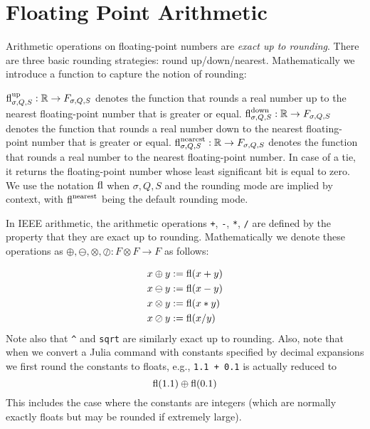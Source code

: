 
\section{Floating Point Arithmetic}
Arithmetic operations on floating-point numbers are  \emph{exact up to rounding}. There are three basic rounding strategies: round up/down/nearest. Mathematically we introduce a function to capture the notion of rounding:

\begin{definition}[rounding] ${\rm fl}^{\rm up}_{\ensuremath{\sigma},Q,S} : \mathbb R \rightarrow F_{\ensuremath{\sigma},Q,S}$ denotes the function that rounds a real number up to the nearest floating-point number that is greater or equal. ${\rm fl}^{\rm down}_{\ensuremath{\sigma},Q,S} : \mathbb R \rightarrow F_{\ensuremath{\sigma},Q,S}$ denotes the function that rounds a real number down to the nearest floating-point number that is greater or equal. ${\rm fl}^{\rm nearest}_{\ensuremath{\sigma},Q,S} : \mathbb R \rightarrow F_{\ensuremath{\sigma},Q,S}$ denotes the function that rounds a real number to the nearest floating-point number. In case of a tie, it returns the floating-point number whose least significant bit is equal to zero. We use the notation ${\rm fl}$ when $\ensuremath{\sigma},Q,S$ and the rounding mode are implied by context, with ${\rm fl}^{\rm nearest}$ being the default rounding mode. \end{definition}

In IEEE arithmetic, the arithmetic operations \texttt{+}, \texttt{-}, \texttt{*}, \texttt{/} are defined by the property that they are exact up to rounding.  Mathematically we denote these operations as $\ensuremath{\oplus}, \ensuremath{\ominus}, \ensuremath{\otimes}, \ensuremath{\oslash} : F \ensuremath{\otimes} F \ensuremath{\rightarrow} F$ as follows:


\begin{align*}
x \ensuremath{\oplus} y &:= {\rm fl}(x+y) \\
x \ensuremath{\ominus} y &:= {\rm fl}(x - y) \\
x \ensuremath{\otimes} y &:= {\rm fl}(x * y) \\
x \ensuremath{\oslash} y &:= {\rm fl}(x / y)
\end{align*}
Note also that  \texttt{\^{}} and \texttt{sqrt} are similarly exact up to rounding. Also, note that when we convert a Julia command with constants specified by decimal expansions we first round the constants to floats, e.g., \texttt{1.1 + 0.1} is actually reduced to
\[
{\rm fl}(1.1) \ensuremath{\oplus} {\rm fl}(0.1)
\]
This includes the case where the constants are integers (which are normally exactly floats but may be rounded if extremely large).

